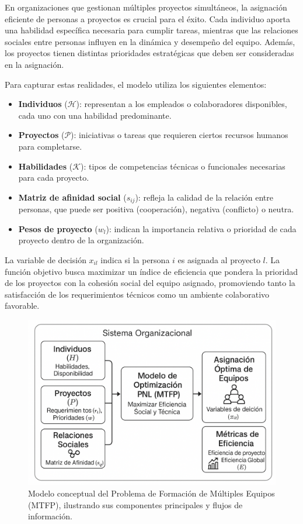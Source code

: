 \documentclass[conference]{IEEEtran}
\begin{document}
En organizaciones que gestionan múltiples proyectos simultáneos, la asignación eficiente de personas a proyectos es crucial para el éxito. Cada individuo aporta una habilidad específica necesaria para cumplir tareas, mientras que las relaciones sociales entre personas influyen en la dinámica y desempeño del equipo. Además, los proyectos tienen distintas prioridades estratégicas que deben ser consideradas en la asignación.

Para capturar estas realidades, el modelo utiliza los siguientes elementos:

\begin{itemize}
    \item \textbf{Individuos} (\(\mathcal{H}\)): representan a los empleados o colaboradores disponibles, cada uno con una habilidad predominante.
    \item \textbf{Proyectos} (\(\mathcal{P}\)): iniciativas o tareas que requieren ciertos recursos humanos para completarse.
    \item \textbf{Habilidades} (\(\mathcal{K}\)): tipos de competencias técnicas o funcionales necesarias para cada proyecto.
    \item \textbf{Matriz de afinidad social} (\(s_{ij}\)): refleja la calidad de la relación entre personas, que puede ser positiva (cooperación), negativa (conflicto) o neutra.
    \item \textbf{Pesos de proyecto} (\(w_l\)): indican la importancia relativa o prioridad de cada proyecto dentro de la organización.
\end{itemize}

La variable de decisión \(x_{il}\) indica si la persona \(i\) es asignada al proyecto \(l\). La función objetivo busca maximizar un índice de eficiencia que pondera la prioridad de los proyectos con la cohesión social del equipo asignado, promoviendo tanto la satisfacción de los requerimientos técnicos como un ambiente colaborativo favorable.


\begin{figure}[htbp]
    \centering
    \includegraphics[width=0.8\linewidth]{diagrama_conceptual_mtfp.png}
    \caption{Modelo conceptual del Problema de Formación de Múltiples Equipos (MTFP), ilustrando sus componentes principales y flujos de información.}
    \label{fig:conceptual_model}
\end{figure}
\end{document}
